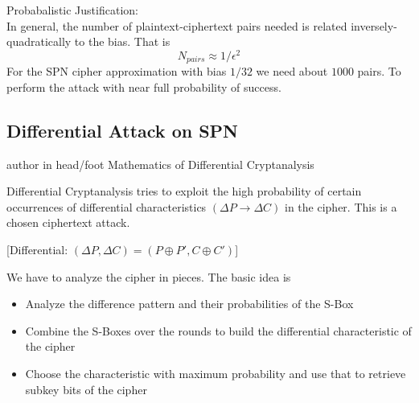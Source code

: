 \documentclass[9pt]{beamer}
\begin{document}
\begin{frame}
Probabalistic Justification:\\
\vspace{5mm}
In general, the number of plaintext-ciphertext pairs needed is related inversely-quadratically to the bias. That is
\[ N_{pairs} \approx 1 / \epsilon^2 \]
For the SPN cipher approximation with bias $1/32$ we need about $1000$ pairs. To perform the attack with near full probability of success.
\end{frame}

\subsection{Differential Attack on SPN}
\begin{frame}
\begin{beamercolorbox}[ht=2.5ex,dp=1.125ex,center,rounded=true,shadow=true]{author in head/foot}
Mathematics of Differential Cryptanalysis
\end{beamercolorbox}
\end{frame}

\begin{frame}
Differential Cryptanalysis tries to exploit the high probability of certain occurrences of differential characteristics $(\Delta P \rightarrow \Delta C)$ in the cipher. This is a chosen ciphertext attack.

[Differential: $(\Delta P, \Delta C) = (P \oplus P', C \oplus C') $]

We have to analyze the cipher in pieces. The basic idea is
\begin{itemize}
\item{Analyze the difference pattern and their probabilities of the S-Box}
\item{Combine the S-Boxes over the rounds to build the differential characteristic of the cipher}
\item{Choose the characteristic with maximum probability and use that to retrieve subkey bits of the cipher}
\end{itemize}
\end{frame}
\end{document}
